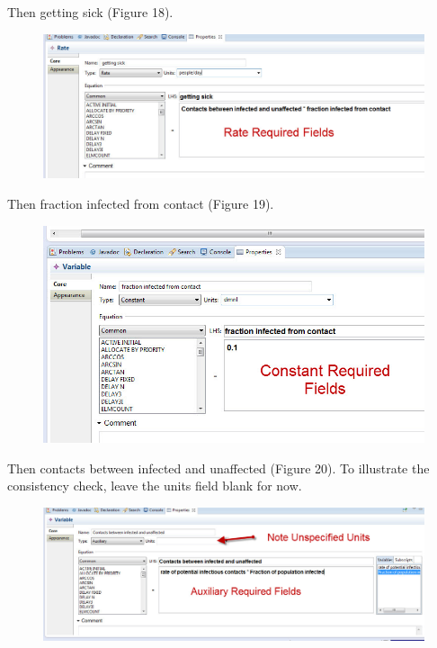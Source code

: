 \documentclass[11pt]{amsart}
\begin{document}
Then getting sick (Figure 18).


\begin{figure}[ht]
\begin{center}
\vspace{.2in}
\centerline {
\includegraphics[totalheight=0.3\textheight]{images/018.jpg}
}
\caption{}
\label{fig:018}
\end{center}
\end{figure}

\clearpage

Then fraction infected from contact (Figure 19).


\begin{figure}[ht]
\begin{center}
\vspace{.2in}
\centerline {
\includegraphics[totalheight=0.3\textheight]{images/019.jpg}
}
\caption{}
\label{fig:019}
\end{center}
\end{figure}

Then contacts between infected and unaffected (Figure 20). To illustrate the consistency check, leave the units field blank for now.


\begin{figure}[ht]
\begin{center}
\vspace{.2in}
\centerline {
\includegraphics[totalheight=0.3\textheight]{images/020.jpg}
}
\caption{}
\label{fig:020}
\end{center}
\end{figure}
\end{document}
